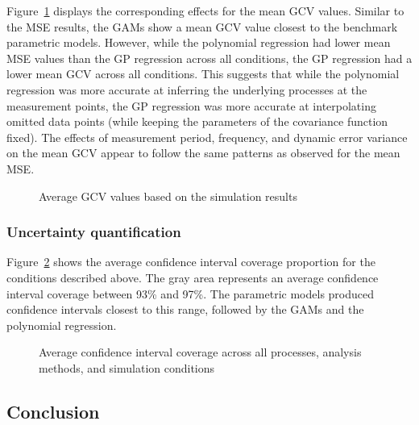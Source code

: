 \documentclass[man, floatsintext]{apa7}
\begin{document}
Figure~\ref{fig:mean_results_gcv} displays the corresponding effects for the
mean GCV values. Similar to the MSE results, the GAMs show a mean GCV value
closest to the benchmark parametric models. However, while the polynomial
regression had lower mean MSE values than the GP regression across all
conditions, the GP regression had a lower mean GCV across all conditions. This
suggests that while the polynomial regression was more accurate at inferring
the underlying processes at the measurement points, the GP regression was more
accurate at interpolating omitted data points (while keeping the parameters of
the covariance function fixed). The effects of measurement period, frequency,
and dynamic error variance on the mean GCV appear to follow the same patterns
as observed for the mean MSE\@.

\begin{figure}[!t]
  \caption{Average GCV values based on the simulation results}
  \label{fig:mean_results_gcv}
\end{figure}

\subsubsection{Uncertainty quantification}

Figure~\ref{fig:mean_results_ci_coverage} shows the average confidence interval
coverage proportion for the conditions described above. The gray area
represents an average confidence interval coverage between 93\% and 97\%. The
parametric models produced confidence intervals closest to this range, followed
by the GAMs and the polynomial regression.

\begin{figure}[!t]
  \caption{Average confidence interval coverage across all processes, analysis
    methods, and simulation conditions}
  \label{fig:mean_results_ci_coverage}
\end{figure}

\subsection{Conclusion}
\end{document}
